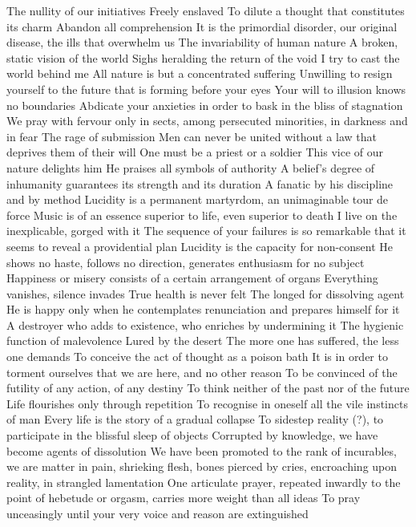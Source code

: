 \documentclass{article}
\begin{document}
The nullity of our initiatives
Freely enslaved
To dilute a thought that constitutes its charm
Abandon all comprehension
It is the primordial disorder, our original disease, the ills that overwhelm us
The invariability of human nature
A broken, static vision of the world
Sighs heralding the return of the void
I try to cast the world behind me
All nature is but a concentrated suffering
Unwilling to resign yourself to the future that is forming before your eyes
Your will to illusion knows no boundaries
Abdicate your anxieties in order to bask in the bliss of stagnation
We pray with fervour only in sects, among persecuted minorities, in darkness and in fear
The rage of submission
Men can never be united without a law that deprives them of their will
One must be a priest or a soldier
This vice of our nature delights him
He praises all symbols of authority
A belief's degree of inhumanity guarantees its strength and its duration
A fanatic by his discipline and by method
Lucidity is a permanent martyrdom, an unimaginable tour de force
Music is of an essence superior to life, even superior to death
I live on the inexplicable, gorged with it
The sequence of your failures is so remarkable that it seems to reveal a providential plan
Lucidity is the capacity for non-consent
He shows no haste, follows no direction, generates enthusiasm for no subject
Happiness or misery consists of a certain arrangement of organs
Everything vanishes, silence invades
True health is never felt
The longed for dissolving agent
He is happy only when he contemplates renunciation and prepares himself for it
A destroyer who adds to existence, who enriches by undermining it
The hygienic function of malevolence
Lured by the desert
The more one has suffered, the less one demands
To conceive the act of thought as a poison bath
It is in order to torment ourselves that we are here, and no other reason
To be convinced of the futility of any action, of any destiny
To think neither of the past nor of the future
Life flourishes only through repetition
To recognise in oneself all the vile instincts of man
Every life is the story of a gradual collapse
To sidestep reality (?), to participate in the blissful sleep of objects
Corrupted by knowledge, we have become agents of dissolution
We have been promoted to the rank of incurables, we are matter in pain, shrieking flesh, bones pierced by cries, encroaching upon reality, in strangled lamentation
One articulate prayer, repeated inwardly to the point of hebetude or orgasm, carries more weight than all ideas
To pray unceasingly until your very voice and reason are extinguished
\end{document}

